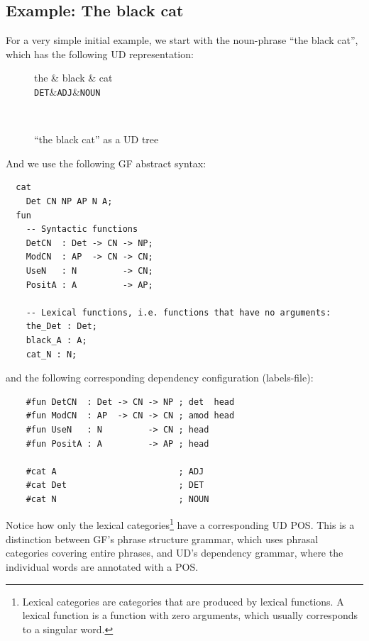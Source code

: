 \subsection{Example: The black cat}

For a very simple initial example, we start with the noun-phrase ``the black cat'', which has the following \ac{UD} representation:

\begin{figure}[H]
    \centering
    \setlength{\unitlength}{0.2mm}
    \begin{dependency}
        \begin{deptext}[column sep=0.4cm]
              the \& black \& cat \\
            {\tt DET}\&{\tt ADJ}\&{\tt NOUN}\\
        \end{deptext}
    \end{dependency} \\
    \caption{``the black cat'' as a UD tree}
    \label{fig:the_black_cat_ud}
\end{figure}

And we use the following \ac{GF} abstract syntax:

\begin{verbatim}
  cat
    Det CN NP AP N A;
  fun
    -- Syntactic functions
    DetCN  : Det -> CN -> NP;
    ModCN  : AP  -> CN -> CN;
    UseN   : N         -> CN;
    PositA : A         -> AP;

    -- Lexical functions, i.e. functions that have no arguments:
    the_Det : Det;
    black_A : A;
    cat_N : N;
\end{verbatim}
and the following corresponding dependency configuration (labels-file):
\begin{verbatim}
    #fun DetCN  : Det -> CN -> NP ; det  head
    #fun ModCN  : AP  -> CN -> CN ; amod head
    #fun UseN   : N         -> CN ; head
    #fun PositA : A         -> AP ; head

    #cat A                        ; ADJ
    #cat Det                      ; DET
    #cat N                        ; NOUN
\end{verbatim}

Notice how only the lexical categories\footnote{Lexical categories are categories that are produced by lexical functions. A lexical function is a function with zero arguments, which usually corresponds to a singular word.} have a corresponding \ac{UD} \ac{POS}. This is a distinction between \ac{GF}'s phrase structure grammar, which uses phrasal categories covering entire phrases, and \ac{UD}'s dependency grammar, where the individual words are annotated with a \ac{POS}.

